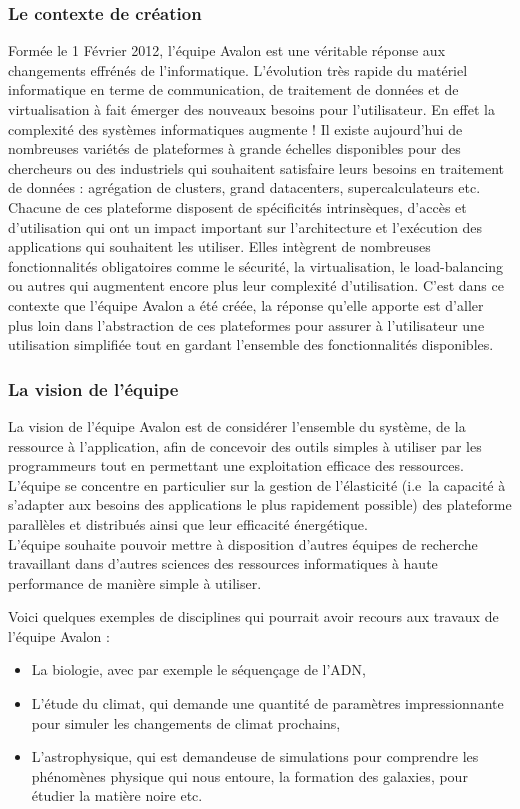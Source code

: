 \subsubsection{Le contexte de création}
Formée le 1 Février 2012, l'équipe Avalon est une véritable réponse aux changements effrénés de l'informatique.
L'évolution très rapide du matériel informatique en terme de communication, de traitement de données et de virtualisation à fait émerger des nouveaux besoins pour l'utilisateur. En effet la complexité des systèmes informatiques augmente !
Il existe aujourd'hui de nombreuses variétés de plateformes à grande échelles disponibles pour des chercheurs ou des industriels qui souhaitent satisfaire leurs besoins en traitement de données : agrégation de \glspl{cluster}, grand \glspl{datacenter}, supercalculateurs etc.
Chacune de ces plateforme disposent de spécificités intrinsèques, d'accès et d'utilisation qui ont un impact important sur l'architecture et l'exécution des applications qui souhaitent les utiliser.
Elles intègrent de nombreuses fonctionnalités obligatoires comme le sécurité, la virtualisation, le \gls{load-balancing} ou autres qui augmentent encore plus leur complexité d'utilisation.
C'est dans ce contexte que l'équipe Avalon a été créée, la réponse qu'elle apporte est d'aller plus loin dans l'abstraction de ces plateformes pour assurer à l'utilisateur une utilisation simplifiée tout en gardant l'ensemble des fonctionnalités disponibles.

\subsubsection{La vision de l'équipe}
La vision de l'équipe Avalon est de considérer l'ensemble du système, de la ressource à l'application, afin de concevoir des outils simples à utiliser par les programmeurs tout en permettant une exploitation efficace des ressources.
L'équipe se concentre en particulier sur la gestion de l'élasticité (i.e\ la capacité à s'adapter aux besoins des applications le plus rapidement possible) des plateforme parallèles et distribués ainsi que leur efficacité énergétique.\\

L'équipe souhaite pouvoir mettre à disposition d'autres équipes de recherche travaillant dans d'autres sciences des ressources informatiques à haute performance de manière simple à utiliser.

Voici quelques exemples de disciplines qui pourrait avoir recours aux travaux de l'équipe Avalon :
\begin{itemize}
	\item La biologie, avec par exemple le séquençage de l'ADN,
	\item L'étude du climat, qui demande une quantité de paramètres impressionnante pour simuler les changements de climat prochains,
	\item L'astrophysique, qui est demandeuse de simulations pour comprendre les phénomènes physique qui nous entoure, la formation des galaxies, pour étudier la matière noire etc.
\end{itemize}
